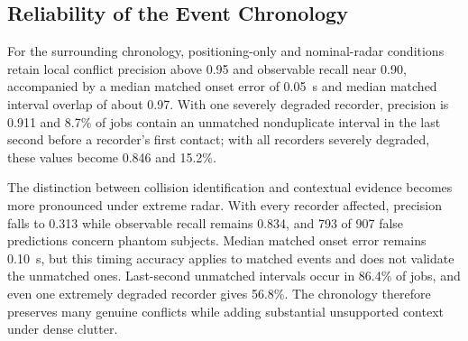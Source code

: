 \subsection{Reliability of the Event Chronology}
\label{subsec:chronology}
For the surrounding chronology, positioning-only and nominal-radar
conditions retain local conflict precision above 0.95 and observable
recall near 0.90, accompanied by a median matched onset error of 0.05~s
and median matched interval overlap of about 0.97. With one severely
degraded recorder, precision is 0.911 and 8.7\% of jobs contain an
unmatched nonduplicate interval in the last second before a recorder's
first contact; with all recorders severely degraded, these values become
0.846 and 15.2\%.

The distinction between collision identification and contextual evidence
becomes more pronounced under extreme radar. With every recorder
affected, precision falls to 0.313 while observable recall remains 0.834,
and 793 of 907 false predictions concern phantom subjects. Median matched
onset error remains 0.10~s, but this timing accuracy applies to matched
events and does not validate the unmatched ones. Last-second unmatched
intervals occur in 86.4\% of jobs, and even one extremely degraded
recorder gives 56.8\%. The chronology therefore preserves many genuine
conflicts while adding substantial unsupported context under dense
clutter.
